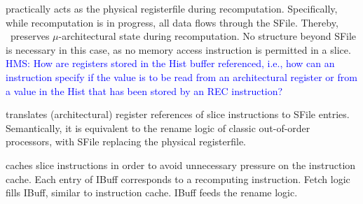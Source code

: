   practically acts as the physical registerfile during recomputation. 
Specifically, while recomputation is in progress, all data flows through the SFile. Thereby, \arch\ preserves $\mu$-architectural state during recomputation. No structure beyond SFile is necessary in this case, as no memory access instruction is permitted in a slice. 
\textcolor{blue}{HMS: How are registers stored in the Hist buffer referenced, i.e., how can an instruction specify if the value is to be read from an architectural register or from a value in the Hist that has been stored by an REC instruction?}

 translates (architectural) register references of slice instructions to SFile entries.
Semantically, it is equivalent to the rename logic of classic out-of-order processors, with SFile replacing the physical registerfile. 

caches slice instructions in order to avoid
unnecessary pressure on the instruction cache.
Each entry of IBuff corresponds to a recomputing instruction. Fetch logic fills IBuff, similar to instruction cache. IBuff feeds the rename logic. 


